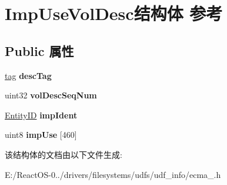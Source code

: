 \hypertarget{struct_imp_use_vol_desc}{}\section{Imp\+Use\+Vol\+Desc结构体 参考}
\label{struct_imp_use_vol_desc}
\subsection*{Public 属性}
\begin{DoxyCompactItemize}
\item 
\mbox{\label{struct_imp_use_vol_desc_ac93bfae6250e015c7b005773cf0779e9}} 
\hyperlink{structtag}{tag} {\bfseries desc\+Tag}
\item 
\mbox{\label{struct_imp_use_vol_desc_a1e1caa9135586741db43ef394b5ef1a2}} 
uint32 {\bfseries vol\+Desc\+Seq\+Num}
\item 
\mbox{\label{struct_imp_use_vol_desc_a49284e7b417cac1a499aa44a7ceefd94}} 
\hyperlink{struct_entity_i_d}{Entity\+ID} {\bfseries imp\+Ident}
\item 
\mbox{\label{struct_imp_use_vol_desc_ab38624a7f3c389ce13325ac373a8c481}} 
uint8 {\bfseries imp\+Use} \mbox{[}460\mbox{]}
\end{DoxyCompactItemize}


该结构体的文档由以下文件生成\+:\begin{DoxyCompactItemize}
\item 
E\+:/\+React\+O\+S-\/0../drivers/filesystems/udfs/udf\+\_\+info/ecma\+\_.\+h\end{DoxyCompactItemize}
